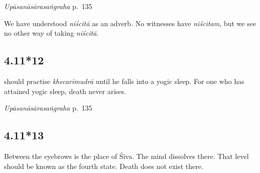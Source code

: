 \begin{ekdosis}
\begin{testimonia}[hp04_011_11]
\emph{Upāsanāsārasaṅgraha} p.~135
\begin{versinnote}
\end{versinnote}
\end{testimonia}

\begin{philcomm}[hp04_011_11]
We have understood \emph{niścitā} as an adverb. No witnesses have \emph{niścitam}, but we see no other way of taking \emph{niścitā}.
\end{philcomm}

\subsection*{4.11*12}
\begin{translation} should practise \emph{khecarīmudrā} until he falls into a yogic sleep. For one who has attained yogic sleep, death never arises.
\end{translation}


\begin{testimonia}[hp04_011_12]
\emph{Upāsanāsārasaṅgraha} p.~135
\begin{versinnote}
\end{versinnote}
\end{testimonia}

\begin{philcomm}[hp04_011_12]
\end{philcomm}



\subsection*{4.11*13}
\begin{translation}[hp04_011_13]
Between the eyebrows is the place of Śiva. The mind dissolves there. That level should be known as the fourth state. Death does not exist there.
\end{translation}
%


\end{ekdosis}
